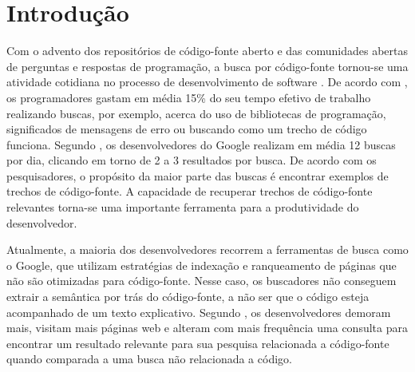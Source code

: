 \chapter{Introdução}
\label{cap:introducao}


Com o advento dos repositórios de código-fonte aberto e das comunidades abertas de perguntas e respostas de programação, a busca por código-fonte tornou-se uma atividade cotidiana no processo de desenvolvimento de software \citep{towards-summarizing-source-code-search:marin:2020}. De acordo com \cite{what-developers-search-for-on-the-web:xia:2017}, os programadores gastam em média 15\% do seu tempo efetivo de trabalho realizando buscas, por exemplo, acerca do uso de bibliotecas de programação, significados de mensagens de erro ou buscando como um trecho de código funciona. Segundo \cite{sadowski-how-developers-search-for-code-case-study:2015}, os desenvolvedores do Google realizam em média 12 buscas por dia, clicando em torno de 2 a 3 resultados por busca. De acordo com os pesquisadores, o propósito da maior parte das buscas é encontrar exemplos de trechos de código-fonte. A capacidade de recuperar trechos de código-fonte relevantes torna-se uma importante ferramenta para a produtividade do desenvolvedor. 

Atualmente, a maioria dos desenvolvedores recorrem a ferramentas de busca como o Google, que utilizam estratégias de indexação e ranqueamento de páginas que não são otimizadas para código-fonte. Nesse caso, os buscadores não conseguem extrair a semântica por trás do código-fonte, a não ser que o código esteja acompanhado de um texto explicativo. Segundo \cite{masudur-developers-use-google-code-retrieval:2018}, os desenvolvedores demoram mais, visitam mais páginas web e alteram com mais frequência uma consulta para encontrar um resultado relevante para sua pesquisa relacionada a código-fonte quando comparada a uma busca não relacionada a código.

